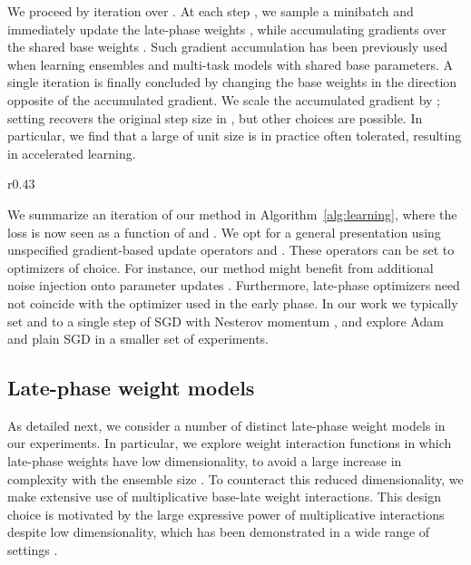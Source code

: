 \documentclass{article} \usepackage{iclr2021_conference,times}
\begin{document}
We proceed by iteration over . At each step , we sample a minibatch  and immediately update the late-phase weights , while accumulating gradients over the shared base weights . Such gradient accumulation has been previously used when learning ensembles \citep{lee_why_2015,wen_batchensemble_2020} and multi-task models \citep{rebuffi_learning_2017} with shared base parameters. A single iteration is finally concluded by changing the base weights in the direction opposite of the accumulated gradient. We scale the accumulated gradient by ; setting  recovers the original step size in , but other choices are possible. In particular, we find that a large  of unit size is in practice often tolerated, resulting in accelerated learning.

\setlength\intextsep{0pt}
\begin{wrapfigure}{r}{0.43\textwidth}
    \begin{minipage}{0.43\textwidth}
    \begin{algorithm}[H]
      

      
      \caption{Late-phase learning\label{alg:learning}}
     \end{algorithm}
    \end{minipage}
\end{wrapfigure}
We summarize an iteration of our method in Algorithm~\ref{alg:learning}, where the loss  is now seen as a function of  and . We opt for a general presentation using unspecified gradient-based update operators  and . These operators can be set to optimizers of choice. For instance, our method might benefit from additional noise injection onto parameter updates \citep{welling_bayesian_2011}. Furthermore, late-phase optimizers need not coincide with the optimizer used in the early phase. In our work we typically set  and  to a single step of SGD with Nesterov momentum \citep{nesterov_introductory_2004}, and explore Adam \citep{kingma_adam:_2015} and plain SGD in a smaller set of experiments.



\subsection{Late-phase weight models}
\label{section:late-phase-models}
As detailed next, we consider a number of distinct late-phase weight models in our experiments. In particular, we explore weight interaction functions  in which late-phase weights have low dimensionality, to avoid a large increase in complexity with the ensemble size . To counteract this reduced dimensionality, we make extensive use of multiplicative base-late weight interactions. This design choice is motivated by the large expressive power of multiplicative interactions despite low dimensionality, which has been demonstrated in a wide range of settings \citep{jayakumar_multiplicative_2020}.
\end{document}
